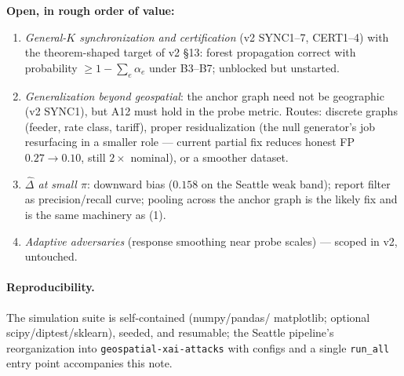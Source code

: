 \documentclass[11pt]{article}
\begin{document}
\textbf{Open, in rough order of value:}
\begin{enumerate}[leftmargin=2.2em,itemsep=1pt]
  \item \emph{General-$K$ synchronization and certification} (v2 SYNC1--7, CERT1--4) with
  the theorem-shaped target of v2 \S13: forest propagation correct with probability
  $\ge 1-\sum_e\alpha_e$ under B3--B7; unblocked but unstarted.
  \item \emph{Generalization beyond geospatial}: the anchor graph need not be geographic
  (v2 SYNC1), but A12 must hold in the probe metric. Routes: discrete graphs (feeder, rate
  class, tariff), proper residualization (the null generator's job resurfacing in a smaller
  role --- current partial fix reduces honest FP $0.27\to 0.10$, still $2\times$ nominal),
  or a smoother dataset.
  \item \emph{$\widehat\Delta$ at small $\pi$}: downward bias ($0.158$ on the Seattle weak
  band); report filter as precision/recall curve; pooling across the anchor graph is the
  likely fix and is the same machinery as (1).
  \item \emph{Adaptive adversaries} (response smoothing near probe scales) --- scoped in v2,
  untouched.
\end{enumerate}

\paragraph{Reproducibility.} The simulation suite is self-contained (numpy/pandas/
matplotlib; optional scipy/diptest/sklearn), seeded, and resumable; the Seattle pipeline's
reorganization into \texttt{geospatial-xai-attacks} with configs and a single
\texttt{run\_all} entry point accompanies this note.
\end{document}
